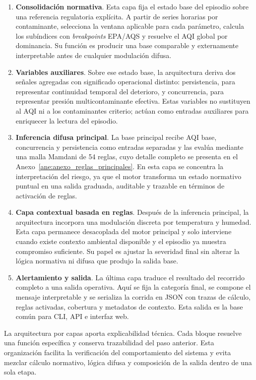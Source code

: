 \begin{enumerate}
\item \textbf{Consolidación normativa}. Esta capa fija el estado base del episodio sobre una referencia regulatoria explícita. A partir de series horarias por contaminante, selecciona la ventana aplicable para cada parámetro, calcula los subíndices con \textit{breakpoints} EPA/AQS y resuelve el AQI global por dominancia. Su función es producir una base comparable y externamente interpretable antes de cualquier modulación difusa.
\item \textbf{Variables auxiliares}. Sobre ese estado base, la arquitectura deriva dos señales agregadas con significado operacional distinto: persistencia, para representar continuidad temporal del deterioro, y concurrencia, para representar presión multicontaminante efectiva. Estas variables no sustituyen al AQI ni a los contaminantes criterio; actúan como entradas auxiliares para enriquecer la lectura del episodio.
\item \textbf{Inferencia difusa principal}. La base principal recibe AQI base, concurrencia y persistencia como entradas separadas y las evalúa mediante una malla Mamdani de 54 reglas, cuyo detalle completo se presenta en el Anexo~\ref{ane:anexo_reglas_principales}. En esta capa se concentra la interpretación del riesgo, ya que el motor transforma un estado normativo puntual en una salida graduada, auditable y trazable en términos de activación de reglas.
\item \textbf{Capa contextual basada en reglas}. Después de la inferencia principal, la arquitectura incorpora una modulación discreta por temperatura y humedad. Esta capa permanece desacoplada del motor principal y solo interviene cuando existe contexto ambiental disponible y el episodio ya muestra compromiso suficiente. Su papel es ajustar la severidad final sin alterar la lógica normativa ni difusa que produjo la salida base.
\item \textbf{Alertamiento y salida}. La última capa traduce el resultado del recorrido completo a una salida operativa. Aquí se fija la categoría final, se compone el mensaje interpretable y se serializa la corrida en JSON con trazas de cálculo, reglas activadas, cobertura y metadatos de contexto. Esta salida es la base común para CLI, API e interfaz web.
\end{enumerate}

La arquitectura por capas aporta explicabilidad técnica. Cada bloque resuelve una función específica y conserva trazabilidad del paso anterior. Esta organización facilita la verificación del comportamiento del sistema y evita mezclar cálculo normativo, lógica difusa y composición de la salida dentro de una sola etapa.

